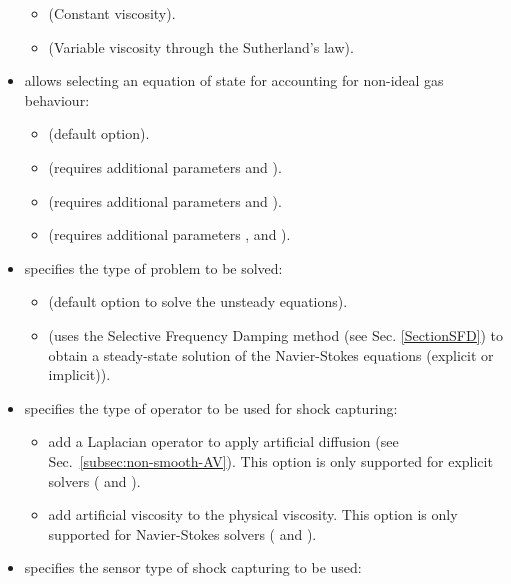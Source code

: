 \begin{itemize}
    \begin{itemize}
      \item {} (Constant viscosity).
      \item {} (Variable viscosity through the Sutherland's law).
    \end{itemize}
  \item {} allows selecting an equation of state for
    accounting for non-ideal gas behaviour:
    \begin{itemize}
        \item {} (default option).
        \item {} (requires additional parameters  and ).
        \item {} (requires additional parameters  and ).
        \item {} (requires additional parameters ,  and
          ).
      \end{itemize}
  \item {} specifies the type of problem to be solved:
    \begin{itemize}
      \item {} (default option to solve the unsteady equations).
      \item {} (uses the Selective Frequency Damping method
        (see Sec. \ref{SectionSFD}) to obtain a steady-state solution of the
        Navier-Stokes equations (explicit or implicit)).
    \end{itemize}
  \item {} specifies the type of operator to be used for shock capturing:
    \begin{itemize}
      \item {} add a Laplacian operator to apply artificial diffusion (see Sec.~\ref{subsec:non-smooth-AV}). 
        This option is only supported for explicit solvers ( and ).
      \item {} add artificial viscosity to the physical viscosity.
        This option is only supported for Navier-Stokes solvers ( and ).
    \end{itemize}
  \item {} specifies the sensor type of shock capturing to be used:

\end{itemize}
